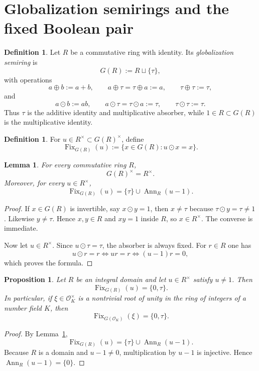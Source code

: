 \documentclass[11pt,a4paper]{article}
\newtheorem{proposition}[theorem]{Proposition}
\newtheorem{lemma}[theorem]{Lemma}
\theoremstyle{definition}
\newtheorem{definition}[theorem]{Definition}
\theoremstyle{remark}
\DeclareMathOperator{\Fix}{Fix}
\DeclareMathOperator{\Ann}{Ann}
\newcommand{\cO}{\mathcal O}
\newcommand{\taup}{\tau}
\begin{document}
\section{Globalization semirings and the fixed Boolean pair}

\begin{definition}
Let $R$ be a commutative ring with identity.  Its \emph{globalization semiring} is
\[
G(R):=R\sqcup\{\taup\},
\]
with operations
\[
a\oplus b:=a+b,\qquad a\oplus\taup=\taup\oplus a:=a,\qquad \taup\oplus\taup:=\taup,
\]
and
\[
a\odot b:=ab,\qquad a\odot\taup=\taup\odot a:=\taup,\qquad \taup\odot\taup:=\taup.
\]
Thus $\taup$ is the additive identity and multiplicative absorber, while $1\in R\subset G(R)$ is the multiplicative identity.
\end{definition}

\begin{definition}
For $u\in R^\times\subset G(R)^\times$, define
\[
\Fix_{G(R)}(u):=\{x\in G(R):u\odot x=x\}.
\]
\end{definition}

\begin{lemma}\label{lem:units-fix}
For every commutative ring $R$,
\[
G(R)^\times=R^\times.
\]
Moreover, for every $u\in R^\times$,
\[
\Fix_{G(R)}(u)=\{\taup\}\cup\Ann_R(u-1).
\]
\end{lemma}

\begin{proof}
If $x\in G(R)$ is invertible, say $x\odot y=1$, then $x\neq\taup$ because $\taup\odot y=\taup\neq1$.  Likewise $y\neq\taup$.  Hence $x,y\in R$ and $xy=1$ inside $R$, so $x\in R^\times$.  The converse is immediate.

Now let $u\in R^\times$.  Since $u\odot\taup=\taup$, the absorber is always fixed.  For $r\in R$ one has
\[
u\odot r=r \iff ur=r \iff (u-1)r=0,
\]
which proves the formula.
\end{proof}

\begin{proposition}\label{prop:split-root-domain}
Let $R$ be an integral domain and let $u\in R^\times$ satisfy $u\neq1$.  Then
\[
\Fix_{G(R)}(u)=\{0,\taup\}.
\]
In particular, if $\xi\in\cO_K^\times$ is a nontrivial root of unity in the ring of integers of a number field $K$, then
\[
\Fix_{G(\cO_K)}(\xi)=\{0,\taup\}.
\]
\end{proposition}

\begin{proof}
By Lemma~\ref{lem:units-fix},
\[
\Fix_{G(R)}(u)=\{\taup\}\cup\Ann_R(u-1).
\]
Because $R$ is a domain and $u-1\neq0$, multiplication by $u-1$ is injective.  Hence $\Ann_R(u-1)=\{0\}$.
\end{proof}
\end{document}
